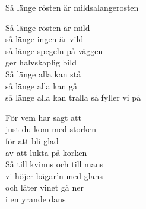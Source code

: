 \begin{song}{Så länge rösten är mild}{salangerosten}
\begin{vers}
Så länge rösten är mild\\
så länge ingen är vild\\
så länge spegeln på väggen\\
ger halvskaplig bild\\
Så länge alla kan stå\\
så länge alla kan gå\\
så länge alla kan tralla så fyller vi på\\
\end{vers}
\begin{vers}
För vem har sagt att\\
just du kom med storken\\
för att bli glad\\
av att lukta på korken\\
Så till kvinns och till mans\\
vi höjer bägar'n med glans\\
och låter vinet gå ner\\
i en yrande dans\\
\end{vers}
\end{song}
